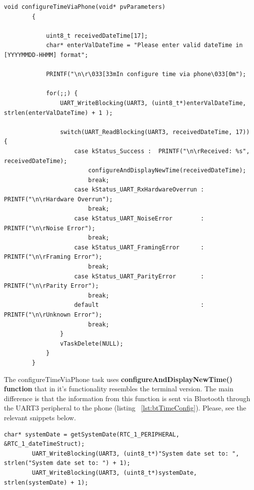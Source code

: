 \documentclass[12pt,a4paper]{article}
\begin{document}
        \begin{lstlisting}[label={lst:configureTimeViaPhone}, caption=configureTimeViaPhone() task]
         void configureTimeViaPhone(void* pvParameters)
        {

            uint8_t receivedDateTime[17];
            char* enterValDateTime = "Please enter valid dateTime in [YYYYMMDD-HHMM] format";

            PRINTF("\n\r\033[33mIn configure time via phone\033[0m");

            for(;;) {
                UART_WriteBlocking(UART3, (uint8_t*)enterValDateTime, strlen(enterValDateTime) + 1 );

                switch(UART_ReadBlocking(UART3, receivedDateTime, 17)) {
                    case kStatus_Success : 	PRINTF("\n\rReceived: %s", receivedDateTime);
                        configureAndDisplayNewTime(receivedDateTime);
                        break;
                    case kStatus_UART_RxHardwareOverrun : 	PRINTF("\n\rHardware Overrun"); 
                        break;
                    case kStatus_UART_NoiseError 		: 	PRINTF("\n\rNoise Error"); 
                        break;
                    case kStatus_UART_FramingError 		: 	PRINTF("\n\rFraming Error"); 
                        break;
                    case kStatus_UART_ParityError 		: 	PRINTF("\n\rParity Error"); 
                        break;
                    default								: 	PRINTF("\n\rUnknown Error"); 
                        break;
                }
                vTaskDelete(NULL);
            }
        }
        \end{lstlisting}
        The configureTimeViaPhone task uses {\bfseries configureAndDisplayNewTime() function} that in it's functionality resembles the terminal version. The main difference is that the information from this function is sent via Bluetooth through the UART3 peripheral to the phone (listing ~\ref{lst:btTimeConfig}). Please, see the relevant snippets below. 
        \begin{lstlisting}[label={lst:btTimeConfig}, caption=Time and date BT communication]
        char* systemDate = getSystemDate(RTC_1_PERIPHERAL, &RTC_1_dateTimeStruct);
        UART_WriteBlocking(UART3, (uint8_t*)"System date set to: ", strlen("System date set to: ") + 1);
        UART_WriteBlocking(UART3, (uint8_t*)systemDate, strlen(systemDate) + 1);
        \end{lstlisting}
        
\end{document}
